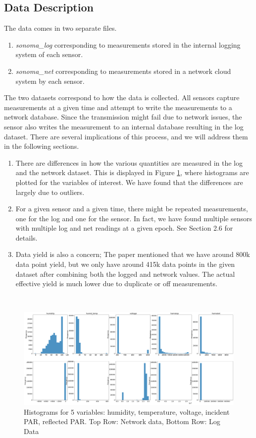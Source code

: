 \documentclass[11pt, letterpaper]{article}
\begin{document}
\subsection{Data Description}
The data comes in two separate files.
\begin{enumerate}
    \item \textit{sonoma\_log} corresponding to measurements stored in the internal logging system of each sensor.
    \item \textit{sonoma\_net} corresponding to measurements stored in a network cloud system by each sensor.
\end{enumerate}
The two datasets correspond to how the data is collected. All sensors capture measurements at a given time and attempt to write the measurements to a network database. Since the transmission might fail due to network issues, the sensor also writes the measurement to an internal database resulting in the log dataset. There are several implications of this process, and we will address them in the following sections.
\begin{enumerate}
    \item There are differences in how the various quantities are measured in the log and the network dataset. This is displayed in Figure \ref{fig1}, where histograms are plotted for the variables of interest. We have found that the differences are largely due to outliers.
    \item For a given sensor and a given time, there might be repeated measurements, one for the log and one for the sensor. In fact, we have found multiple sensors with multiple log and net readings at a given epoch. See Section 2.6 for details.
    \item Data yield is also a concern; The paper mentioned that we have around 800k data point yield, but we only have around 415k data points in the given dataset after combining both the logged and network values. The actual effective yield is much lower due to duplicate or off measurements.
\end{enumerate} \\

\begin{figure}[!h]
\centering
\includegraphics[width=1.0\textwidth]{Report Images/Fig1.png}
\caption{Histograms for 5 variables: humidity, temperature, voltage, incident PAR, reflected PAR. Top Row: Network data, Bottom Row: Log Data}
\label{fig1}
\end{figure}
\end{document}
